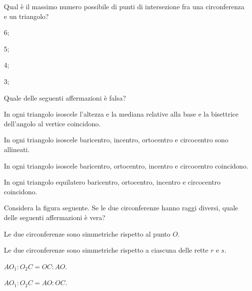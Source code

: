 \begin{esercizio}
\label{ese:5.65}
Qual è il massimo numero possibile di punti di intersezione fra una circonferenza e un triangolo?
\begin{multicols}{4}
\begin{enumeratea}
\item 6;
\item 5;
\item 4;
\item 3;
\end{enumeratea}
\end{multicols}
\end{esercizio}

\begin{esercizio}
\label{ese:5.66}
Quale delle seguenti affermazioni è falsa? 
\begin{enumeratea}
\item In ogni triangolo isoscele l'altezza e la mediana relative alla base e la bisettrice dell'angolo al vertice coincidono.
\item In ogni triangolo isoscele baricentro, incentro, ortocentro e circocentro sono allineati.
\item In ogni triangolo isoscele baricentro, ortocentro, incentro e circocentro coincidono.
\item In ogni triangolo equilatero baricentro, ortocentro, incentro e circocentro coincidono.
\end{enumeratea}
\end{esercizio}

\begin{esercizio}
\label{ese:5.67}
Considera la figura seguente. Se le due circonferenze hanno raggi diversi, quale delle seguenti affermazioni è vera?
\begin{enumeratea}
\item Le due circonferenze sono simmetriche rispetto al punto $O$.
\item Le due circonferenze sono simmetriche rispetto a ciascuna delle rette $r$ e $s$.
\item $AO_1:O_2C=OC:AO$.
\item $AO_1:O_2C=AO:OC$.
\end{enumeratea}
\end{esercizio}
\begin{figure}[!htb]
	\centering
\end{figure}

